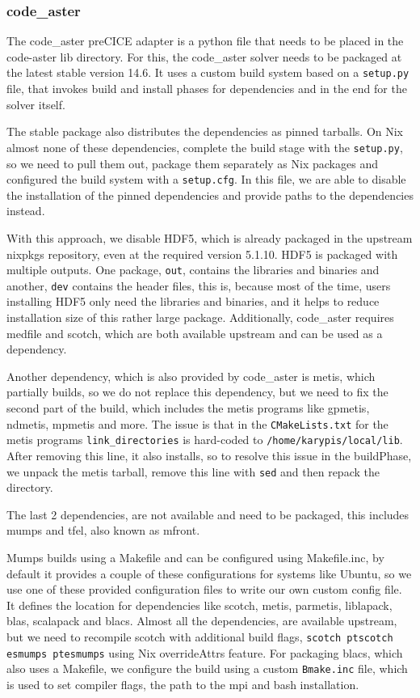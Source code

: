 \documentclass[conference,final,a4paper]{IEEEtran}
\begin{document}
\subsubsection{code\_aster}

The code\_aster preCICE adapter is a python file that needs to be placed in the code-aster lib directory.
For this, the code\_aster solver needs to be packaged at the latest stable version 14.6.
It uses a custom build system based on a \texttt{setup.py} file, that invokes build and install phases for dependencies and in the end for the solver itself.

The stable package also distributes the dependencies as pinned tarballs.
On Nix almost none of these dependencies, complete the build stage with the \texttt{setup.py}, so we need to pull them out, package them separately as Nix packages and configured the build system with a \texttt{setup.cfg}.
In this file, we are able to disable the installation of the pinned dependencies and provide paths to the dependencies instead.

With this approach, we disable HDF5, which is already packaged in the upstream nixpkgs repository, even at the required version 5.1.10.
HDF5 is packaged with multiple outputs.
One package, \texttt{out}, contains the libraries and binaries and another, \texttt{dev} contains the header files, this is, because most of the time, users installing HDF5 only need the libraries and binaries, and it helps to reduce installation size of this rather large package.
Additionally, code\_aster requires medfile and scotch, which are both available upstream and can be used as a dependency.

Another dependency, which is also provided by code\_aster is metis, which partially builds, so we do not replace this dependency, but we need to fix the second part of the build, which includes the metis programs like gpmetis, ndmetis, mpmetis and more.
The issue is that in the \texttt{CMakeLists.txt} for the metis programs \texttt{link\_directories} is hard-coded to \texttt{/home/karypis/local/lib}.
After removing this line, it also installs, so to resolve this issue in the buildPhase, we unpack the metis tarball, remove this line with \texttt{sed} and then repack the directory.

The last 2 dependencies, are not available and need to be packaged, this includes mumps and tfel, also known as mfront.

Mumps builds using a Makefile and can be configured using Makefile.inc, by default it provides a couple of these configurations for systems like Ubuntu, so we use one of these provided configuration files to write our own custom config file.
It defines the location for dependencies like scotch, metis, parmetis, liblapack, blas, scalapack and blacs.
Almost all the dependencies, are available upstream, but we need to recompile scotch with additional build flags, \texttt{scotch ptscotch esmumps ptesmumps} using Nix overrideAttrs feature.
For packaging blacs, which also uses a Makefile, we configure the build using a custom \texttt{Bmake.inc} file, which is used to set compiler flags, the path to the mpi and bash installation.
\end{document}
